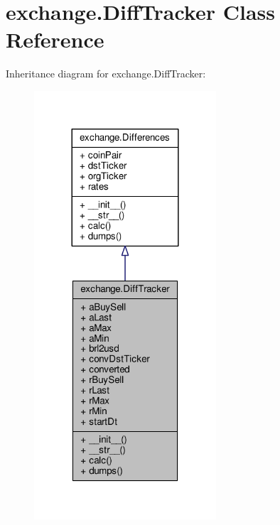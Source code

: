 \hypertarget{classexchange_1_1_diff_tracker}{}\section{exchange.\+Diff\+Tracker Class Reference}
\label{classexchange_1_1_diff_tracker}


Inheritance diagram for exchange.\+Diff\+Tracker\+:
\nopagebreak
\begin{figure}[H]
\begin{center}
\leavevmode
\includegraphics[width=192pt]{classexchange_1_1_diff_tracker__inherit__graph}
\end{center}
\end{figure}


